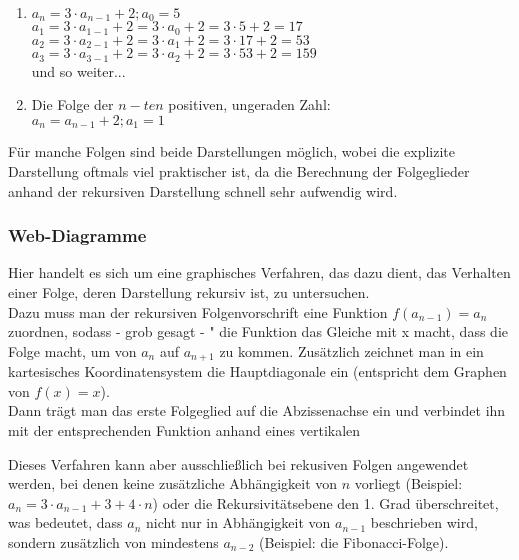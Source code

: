 \begin{Beispiel}
\begin{enumerate}
\item  $a_{n}=3\cdot a_{n-1}+2;a_{0}=5$\\
\indent$a_{1}=3\cdot a_{1-1}+2=3\cdot a_{0}+2=3\cdot5+2=17$\\
\indent$a_{2}=3\cdot a_{2-1}+2=3\cdot a_{1}+2=3\cdot17+2=53$\\
\indent$a_{3}=3\cdot a_{3-1}+2=3\cdot a_{2}+2=3\cdot53+2=159$\\
\indent und so weiter...
\item Die Folge der $n-ten$ positiven, ungeraden Zahl:\\
$a_{n}=a_{n-1}+2;a_{1}=1$
\end{enumerate}
\end{Beispiel}

\begin{Bemerkung}
Für manche Folgen sind beide Darstellungen möglich, wobei die explizite Darstellung oftmals viel praktischer ist, da die Berechnung der Folgeglieder anhand der rekursiven Darstellung schnell sehr aufwendig wird.
\end{Bemerkung}

\subsubsection{Web-Diagramme}
Hier handelt es sich um eine graphisches Verfahren, das dazu dient, das Verhalten einer Folge, deren Darstellung rekursiv ist, zu untersuchen.\\
Dazu muss man der rekursiven Folgenvorschrift eine Funktion $f(a_{n-1})=a_{n}$ zuordnen, sodass - grob gesagt - " die Funktion das Gleiche mit x macht, dass die Folge macht, um von $a_{n}$ auf $a_{n+1}$ zu kommen. Zusätzlich zeichnet man in ein kartesisches Koordinatensystem die Hauptdiagonale ein (entspricht dem Graphen von $f(x)=x$).\\
Dann trägt man das erste Folgeglied auf die Abzissenachse ein und verbindet ihn mit der entsprechenden Funktion anhand eines vertikalen\\

\begin{Bemerkung}
Dieses Verfahren kann aber ausschließlich bei rekusiven Folgen angewendet werden, bei denen keine zusätzliche Abhängigkeit von $n$ vorliegt (Beispiel: $a_{n}=3\cdot a_{n-1}+3+4\cdot n$) oder die Rekursivitätsebene den 1. Grad überschreitet, was bedeutet, dass $a_{n}$ nicht nur in Abhängigkeit von $a_{n-1}$ beschrieben wird, sondern zusätzlich von mindestens $a_{n-2}$ (Beispiel: die Fibonacci-Folge).\\
\end{Bemerkung}




